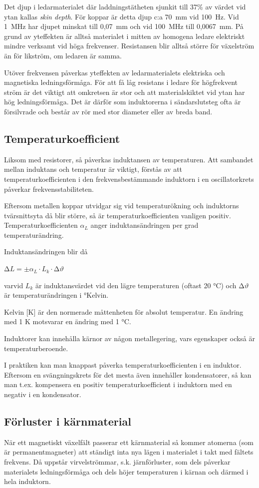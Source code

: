 Det djup i ledarmaterialet där laddningstätheten sjunkit till 37\% av
värdet vid ytan kallas \emph{skin depth}. För koppar är detta djup c:a 70~mm vid
100~Hz. Vid 1~MHz har djupet minskat till 0,07~mm och vid 100~MHz till
0,0067~mm. På grund av yteffekten är alltså materialet i mitten av homogena
ledare elektriskt mindre verksamt vid höga frekvenser. Resistansen blir alltså
större för växelström än för likström, om ledaren är samma.

Utöver frekvensen påverkas yteffekten av ledarmaterialets elektriska och
magnetiska ledningsförmåga. För att få låg resistans i ledare för högfrekvent
ström är det viktigt att omkretsen är stor och att materialskiktet vid ytan har
hög ledningsförmåga. Det är därför som induktorerna i sändarslutsteg ofta är
försilvrade och består av rör med stor diameter eller av breda band.

\subsection{Temperaturkoefficient}

Liksom med resistorer, så påverkas induktansen av temperaturen. Att sambandet
mellan induktans och temperatur är viktigt, förstås av att
temperaturkoefficienten i den frekvensbestämmande induktorn i en oscillatorkrets
påverkar frekvensstabiliteten.

Eftersom metallen koppar utvidgar sig vid temperaturökning och induktorns
tvärsnittsyta då blir större, så är temperaturkoefficienten vanligen positiv.
Temperaturkoefficienten \(\alpha_L\) anger induktansändringen per grad temperaturändring.

Induktansändringen blir då

\(∆L = \pm \alpha _L \cdot L_k \cdot ∆\vartheta\)

varvid \(L_k\) är induktansvärdet vid den lägre temperaturen (oftast 20 °C) och
\(∆\vartheta\) är temperaturändringen i °Kelvin.

Kelvin [K] är den normerade måttenheten för absolut temperatur. En ändring med
1 K motsvarar en ändring med 1 °C.

Induktorer kan innehålla kärnor av någon metallegering, vars egenskaper också är
temperaturberoende.

I praktiken kan man knappast påverka temperaturkoefficienten i en induktor.
Eftersom en svängningskrets för det mesta även innehåller kondensatorer, så kan
man t.ex. kompensera en positiv temperaturkoefficient i induktorn med en negativ
i en kondensator.

\subsection{Förluster i kärnmaterial}

När ett magnetiskt växelfält passerar ett kärnmaterial så kommer atomerna (som
är permanentmagneter) att ständigt inta nya lägen i materialet i takt med
fältets frekvens. Då uppstår virvelströmmar, s.k. järnförluster, som dels
påverkar materialets ledningsförmåga och dels höjer temperaturen i kärnan och
därmed i hela induktorn.
